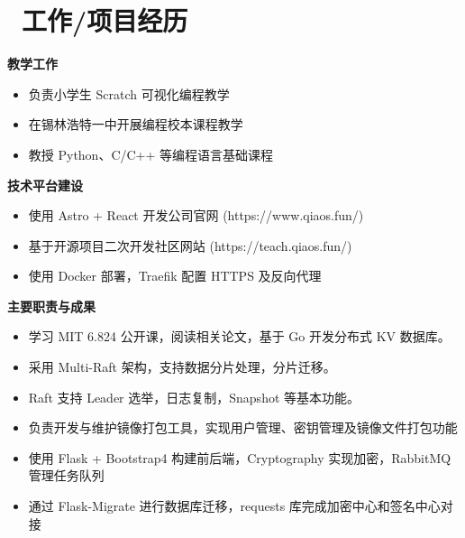 \documentclass{resume}
\begin{document}
\section{\faUsers\ 工作/项目经历}


\begin{onehalfspacing}
\textbf{教学工作}
\begin{itemize}
  \item 负责小学生 Scratch 可视化编程教学
  \item 在锡林浩特一中开展编程校本课程教学
  \item 教授 Python、C/C++ 等编程语言基础课程
\end{itemize}

\textbf{技术平台建设}
\begin{itemize}
  \item 使用 Astro + React 开发公司官网 (https://www.qiaos.fun/)
  \item 基于开源项目二次开发社区网站 (https://teach.qiaos.fun/)
  \item 使用 Docker 部署，Traefik 配置 HTTPS 及反向代理
\end{itemize}

\end{onehalfspacing}


\begin{onehalfspacing}
  \textbf{主要职责与成果}

\begin{itemize}
  \item 学习 MIT 6.824 公开课，阅读相关论文，基于 Go 开发分布式 KV 数据库。
  \item 采用 Multi-Raft 架构，支持数据分片处理，分片迁移。
  \item Raft 支持 Leader 选举，日志复制，Snapshot 等基本功能。
\end{itemize}


\end{onehalfspacing}



\begin{onehalfspacing}
\begin{itemize}
  \item 负责开发与维护镜像打包工具，实现用户管理、密钥管理及镜像文件打包功能
  \item 使用 Flask + Bootstrap4 构建前后端，Cryptography 实现加密，RabbitMQ 管理任务队列
  \item 通过 Flask-Migrate 进行数据库迁移，requests 库完成加密中心和签名中心对接
\end{itemize}
\end{onehalfspacing}
\end{document}
